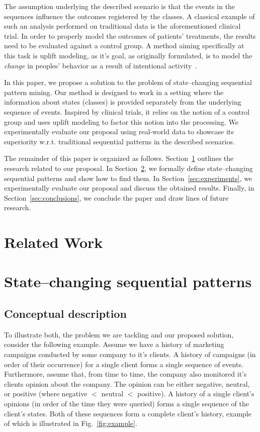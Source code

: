 \documentclass[runningheads,a4paper]{llncs}
\begin{document}
The assumption underlying the described scenario is that the events in the sequences influence the outcomes registered by the classes.
A classical example of such an analysis performed on traditional data is the aforementioned clinical trial.
In order to properly model the outcomes of patients' treatments, the results need to be evaluated against a control group.
A method aiming specifically at this task is uplift modeling, as it's goal, as originally formulated, is to model the \textit{change} in peoples' behavior as a result of intentional activity~\cite{Radcliffe:1999}.

In this paper, we propose a solution to the problem of state--changing sequential pattern mining.
Our method is designed to work in a setting where the information about states (classes) is provided separately from the underlying sequence of events.
Inspired by clinical trials, it relies on the notion of a control group and uses uplift modeling to factor this notion into the processing.
We experimentally evaluate our proposal using real-world data to showcase its superiority w.r.t. traditional sequential patterns in the described scenarios.

The remainder of this paper is organized as follows.
Section~\ref{sec:related} outlines the research related to our proposal.
In Section~\ref{sec:main}, we formally define state--changing sequential patterns and show how to find them.
In Section~\ref{sec:experiments}, we experimentally evaluate our proposal and discuss the obtained results.
Finally, in Section~\ref{sec:conclusions}, we conclude the paper and draw lines of future research.

\section{Related Work}
\label{sec:related}

\section{State--changing sequential patterns}
\label{sec:main}

\subsection{Conceptual description}
To illustrate both, the problem we are tackling and our proposed solution, consider the following example.
Assume we have a history of marketing campaigns conducted by some company to it's clients.
A history of campaigns (in order of their occurrence) for a single client forms a single sequence of events.
Furthermore, assume that, from time to time, the company also monitored it's clients opinion about the company.
The opinion can be either negative, neutral, or positive (where negative $<$ neutral $<$ positive).
A history of a single client's opinions (in order of the time they were queried) forms a single sequence of the client's states.
Both of these sequences form a complete client's history, example of which is illustrated in Fig.~\ref{fig:example}.
\end{document}
